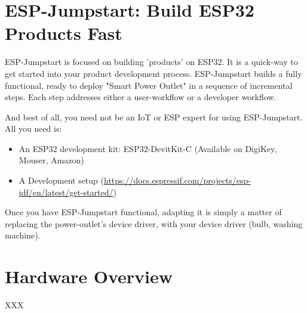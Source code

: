 \documentclass[main.tex]{subfiles}
\begin{document}
\section{ESP-Jumpstart: Build ESP32 Products Fast}

ESP-Jumpstart is focused on building 'products' on ESP32. It is a quick-way to get started into your product development process. ESP-Jumpstart builds a fully functional, ready to deploy "Smart Power Outlet" in a sequence of incremental steps. Each step addresses either a user-workflow or a developer workflow.

And best of all, you need not be an IoT or ESP expert for using ESP-Jumpstart. All you need is:

\begin{itemize}
\item An ESP32 development kit: ESP32-DevitKit-C (Available on DigiKey, Mouser, Amazon)
\item A Development setup (\url{https://docs.espressif.com/projects/esp-idf/en/latest/get-started/})
\end{itemize}

Once you have ESP-Jumpstart functional, adapting it is simply a matter of replacing the power-outlet's device driver, with your device driver (bulb, washing machine).

\section{Hardware Overview}
XXX
\end{document}
